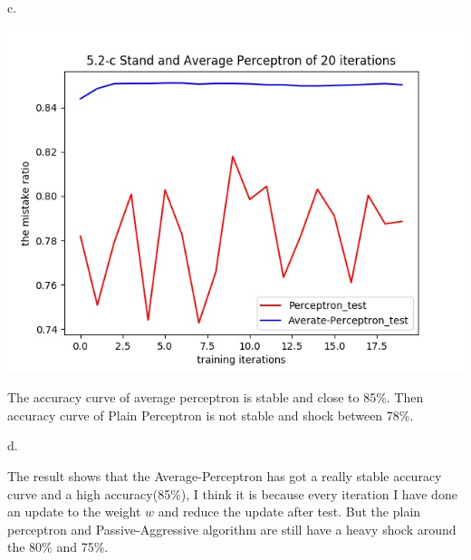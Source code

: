 \documentclass[12pt]{article}
\begin{document}
			\par c.	\par\includegraphics[height=10cm] {part2_c}
			\par The accuracy curve of average perceptron is stable and close to 85\%. Then accuracy curve of Plain Perceptron is not stable and shock between 78\%.
            \par d. 
            \par The result shows that the Average-Perceptron has got a really stable accuracy curve and a high accuracy(85\%), I think it is because every iteration I have done an update to the weight $w$ and reduce the update after test. But the plain perceptron and Passive-Aggressive algorithm are still have a heavy shock around the 80\% and 75\%.
\end{document}
